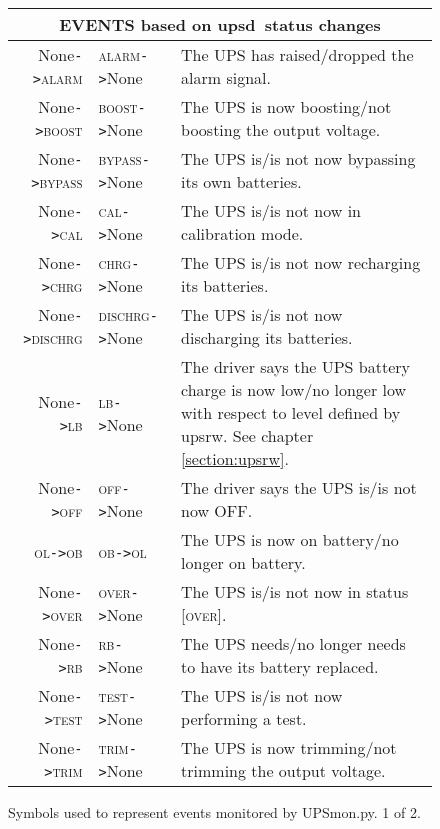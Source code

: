 \documentclass[12pt]{article}
\newcommand{\upsd}{\mbox{\textcolor{UPSDCOLOUR}{upsd}}}
\newcommand{\upsrw}{\mbox{\textcolor{UPSMONCOLOUR}{upsrw}}}
\newcommand{\UPSmon}{\mbox{\textcolor{UPSMONCOLOUR}{UPSmon.py}}}
\newcommand{\ALARM}{\textcolor{UPSDCOLOUR}{\textsc{alarm}}}
\newcommand{\BOOST}{\textcolor{UPSDCOLOUR}{\textsc{boost}}}
\newcommand{\BYPASS}{\textcolor{UPSDCOLOUR}{\textsc{bypass}}}
\newcommand{\CAL}{\textcolor{UPSDCOLOUR}{\textsc{cal}}}
\newcommand{\CHRG}{\textcolor{UPSDCOLOUR}{\textsc{chrg}}}
\newcommand{\DISCHRG}{\textcolor{UPSDCOLOUR}{\textsc{dischrg}}}
\newcommand{\LB}{\textcolor{UPSDCOLOUR}{\textsc{lb}}}
\newcommand{\OB}{\textcolor{UPSDCOLOUR}{\textsc{ob}}}
\newcommand{\OFF}{\textcolor{UPSDCOLOUR}{\textsc{off}}}
\newcommand{\OL}{\textcolor{UPSDCOLOUR}{\textsc{ol}}}
\newcommand{\OVER}{\textcolor{UPSDCOLOUR}{\textsc{over}}}
\newcommand{\RB}{\textcolor{UPSDCOLOUR}{\textsc{rb}}}
\newcommand{\TEST}{\textcolor{UPSDCOLOUR}{\textsc{test}}}
\newcommand{\TRIM}{\textcolor{UPSDCOLOUR}{\textsc{trim}}}
\newcommand{\None}{\textcolor{UPSMONCOLOUR}{\textsf{None}}}
\newcommand{\status}[1]{\textcolor{UPSDCOLOUR}{[{#1}]}}
\newcommand{\EVENT}[2]{\textcolor{MONCOLOUR}{#1}{\allowbreak}\texttt{\textcolor{MONCOLOUR}{->}}{\allowbreak}\textcolor{MONCOLOUR}{#2}}
\begin{document}
\begin{figure}[ht]
\begin{center}
\begin{tabular}{|r|l|p{0.65\LinePrinterwidth}|}
\hline
\multicolumn{3}{|c|}{EVENTS based on \upsd\ status changes} \\ \hline
\EVENT{\None}{\ALARM}   & \EVENT{\ALARM}{\None}    & The UPS has raised/dropped the alarm signal. \\ \hline
\EVENT{\None}{\BOOST}   & \EVENT{\BOOST}{\None}    & The UPS is now boosting/not boosting the output voltage. \\ \hline
\EVENT{\None}{\BYPASS}  & \EVENT{\BYPASS}{\None}   & The UPS is/is not now bypassing its own batteries. \\ \hline
\EVENT{\None}{\CAL}     & \EVENT{\CAL}{\None}      & The UPS is/is not now in calibration mode. \\ \hline
\EVENT{\None}{\CHRG}    & \EVENT{\CHRG}{\None}     & The UPS is/is not now recharging its batteries. \\ \hline
\EVENT{\None}{\DISCHRG} & \EVENT{\DISCHRG}{\None}  & The UPS is/is not now discharging its batteries. \\ \hline
\EVENT{\None}{\LB}      & \EVENT{\LB}{\None}       & The driver says the UPS battery charge is now low/no longer low
                                                     with respect to level defined by \upsrw.
                                                     See chapter \ref{section:upsrw}. \\ \hline
\EVENT{\None}{\OFF}     & \EVENT{\OFF}{\None}      & The driver says the UPS is/is not now OFF. \\ \hline
\EVENT{\OL}{\OB}        & \EVENT{\OB}{\OL}         & The UPS is now on battery/no longer on battery. \\ \hline
\EVENT{\None}{\OVER}    & \EVENT{\OVER}{\None}     & The UPS is/is not now in status \status{\OVER}. \\ \hline
\EVENT{\None}{\RB}      & \EVENT{\RB}{\None}       & The UPS needs/no longer needs to have its battery replaced. \\ \hline
\EVENT{\None}{\TEST}    & \EVENT{\TEST}{\None}     & The UPS is/is not now performing a test. \\ \hline
\EVENT{\None}{\TRIM}    & \EVENT{\TRIM}{\None}     & The UPS is now trimming/not trimming the output voltage. \\ \hline\hline
\end{tabular}
\caption{Symbols used to represent events monitored by \UPSmon.  1 of 2.\label{fig:UPSmonEVENTa}}
\end{center}
\end{figure}
\end{document}
